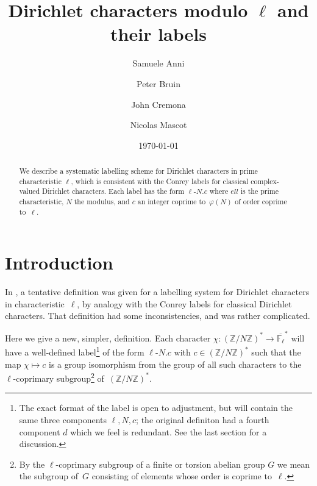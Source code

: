 \documentclass[a4paper, 10pt]{amsart}
\def\Z{{\mathbb Z}}
\def\Flbar{\overline{{\mathbb F}_{\ell}}}
\def\ZNs{(\Z/N\Z)^*}
\newcommand{\DLab}[3]{$#1$-$#2.#3$}
\begin{document}
\title{Dirichlet characters modulo $\ell$ and their labels}

\author{Samuele Anni}
\address{Aix-Marseille Universit\'e, France}
\author{Peter Bruin}
\address{Mathematisch Instituut, University of Leiden, Netherlands}
\author{John Cremona}
\address{Mathematics Institute, University of Warwick, Coventry CV4 7AL, UK}
\author{Nicolas Mascot}
\address{School of Mathematics, Trinity College, Dublin, Republic of Ireland}

\date{\today}

\begin {abstract}
We describe a systematic labelling scheme for Dirichlet characters in
prime characteristic $\ell$, which is consistent with the Conrey
labels for classical complex-valued Dirichlet characters.  Each label
has the form \DLab{\ell}{N}{c} where $ell$ is the prime
characteristic, $N$ the modulus, and $c$ an integer coprime
to~$\varphi(N)$ of order coprime to~$\ell$.
\end {abstract}

\maketitle


\section{Introduction}
In \cite{OldDef}, a tentative definition was given for a labelling
system for Dirichlet characters in characteristic~$\ell$, by analogy
with the Conrey labels for classical Dirichlet characters.  That
definition had some inconsistencies, and was rather complicated.

Here we give a new, simpler, definition.  Each character
$\chi:\ZNs\to\Flbar^*$ will have a well-defined label\footnote{The
  exact format of the label is open to adjustment, but will contain
  the same three components $\ell,N,c$; the original definiton had a
  fourth component $d$ which we feel is redundant.  See the last
  section for a discussion.} of the form \DLab{\ell}{N}{c} with
$c\in\ZNs$ such that the map $\chi\mapsto c$ is a group isomorphism
from the group of all such characters to the $\ell$-coprimary
subgroup\footnote{By the $\ell$-coprimary subgroup of a finite or
  torsion abelian group $G$ we mean the subgroup of~$G$ consisting of
  elements whose order is coprime to~$\ell$.} of~$\ZNs$.
\end{document}
